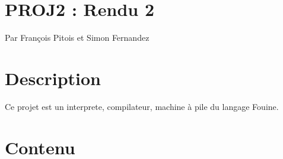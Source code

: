 \section{PROJ2 : Rendu 2}\label{proj2-rendu-2}

Par François Pitois et Simon Fernandez

\section{Description}\label{description}

Ce projet est un interprete, compilateur, machine à pile du langage
Fouine.

\section{Contenu}\label{contenu}

